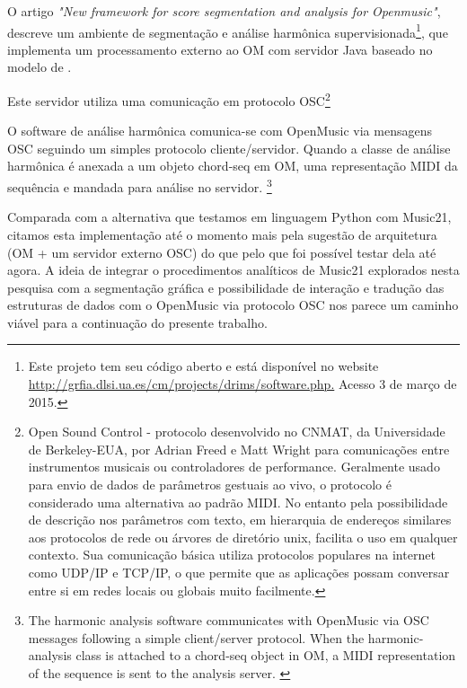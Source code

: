 \documentclass[
	12pt,				%
	openright,			%
	twoside,			%
	a4paper,			%
	english,			%
	french,				%
	spanish,			%
	brazil				%
	]{abntex2}
\begin{document}
O artigo \textit{"New framework for score segmentation and analysis for Openmusic"}\cite{bresson2012new}, descreve um ambiente de segmentação e análise harmônica supervisionada\footnote{Este projeto tem seu código aberto e está disponível no website \url{http://grfia.dlsi.ua.es/cm/projects/drims/software.php.} Acesso 3 de março de 2015.}, que implementa um processamento externo ao OM com servidor Java baseado no modelo de .

Este servidor utiliza uma comunicação em protocolo OSC\footnote{Open Sound Control - protocolo desenvolvido no CNMAT, da Universidade de Berkeley-EUA, por Adrian Freed e Matt Wright para comunicações entre instrumentos musicais ou controladores de performance. Geralmente usado para envio de dados de parâmetros gestuais ao vivo, o protocolo é considerado uma alternativa ao padrão MIDI. No entanto pela possibilidade de descrição nos parâmetros com texto, em hierarquia de endereços similares aos protocolos de rede ou árvores de diretório unix, facilita o uso em qualquer contexto. Sua comunicação básica utiliza protocolos populares na internet como UDP/IP e TCP/IP, o que permite que as aplicações possam conversar entre si em redes locais ou globais muito facilmente. }

\begin{citacao}
O software de análise harmônica comunica-se com OpenMusic via mensagens OSC seguindo um simples protocolo cliente/servidor. Quando a classe de análise harmônica é anexada a um objeto chord-seq em OM, uma representação MIDI da sequência e mandada para análise no servidor. \cite[p. 4]{bresson2012new}\footnote{The harmonic analysis software communicates with OpenMusic via OSC messages following a simple client/server protocol. When the harmonic-analysis class is attached to a chord-seq object in OM, a MIDI representation of the sequence is sent to the analysis server.  \cite[p. 4]{bresson2012new}}
\end{citacao}		


Comparada com a alternativa que testamos em linguagem Python com Music21, citamos esta implementação até o momento mais pela sugestão de arquitetura (OM + um servidor externo OSC) do que pelo que foi possível testar dela até agora. A ideia de integrar o procedimentos analíticos de Music21  explorados nesta pesquisa com a segmentação gráfica e possibilidade de interação e tradução das estruturas de dados com o OpenMusic via protocolo OSC nos parece um caminho viável para a continuação do presente trabalho.
	
\end{document}
